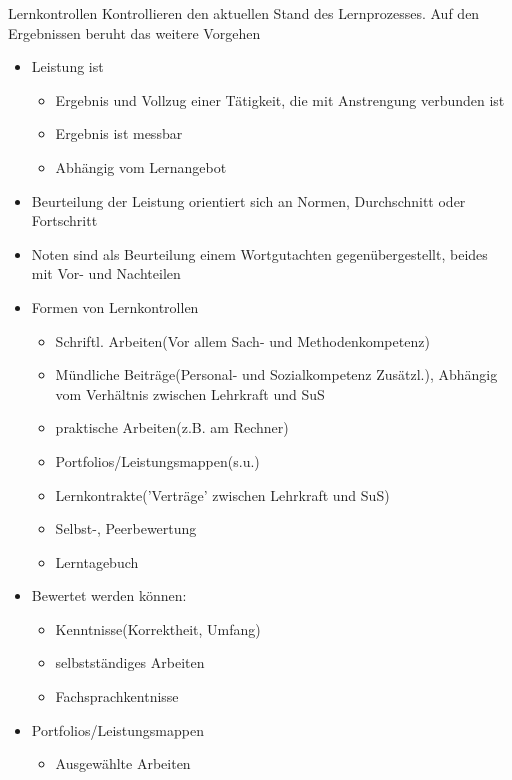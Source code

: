 \documentclass{article}
\begin{document}
\begin{block}{Lernkontrollen}
    Kontrollieren den aktuellen Stand des Lernprozesses. Auf den Ergebnissen  beruht das weitere Vorgehen
    \begin{itemize}
        \item Leistung ist
        \begin{itemize}
            \item Ergebnis und Vollzug einer Tätigkeit, die mit Anstrengung verbunden ist
            \item Ergebnis ist messbar
            \item Abhängig vom Lernangebot
        \end{itemize}
        \item Beurteilung der Leistung orientiert sich an Normen, Durchschnitt oder Fortschritt
        \item Noten sind als Beurteilung einem Wortgutachten gegenübergestellt, beides mit Vor- und Nachteilen
        \item Formen von Lernkontrollen
        \begin{itemize}
            \item Schriftl. Arbeiten(Vor allem Sach- und Methodenkompetenz)
            \item Mündliche Beiträge(Personal- und Sozialkompetenz Zusätzl.), Abhängig vom Verhältnis zwischen Lehrkraft und SuS
            \item praktische Arbeiten(z.B. am Rechner)
            \item Portfolios/Leistungsmappen(s.u.)
            \item Lernkontrakte('Verträge' zwischen Lehrkraft und SuS)
            \item Selbst-, Peerbewertung
            \item Lerntagebuch
        \end{itemize}
        \item Bewertet werden können:
        \begin{itemize}
            \item Kenntnisse(Korrektheit, Umfang)
            \item selbstständiges Arbeiten
            \item Fachsprachkentnisse
        \end{itemize}
        \item Portfolios/Leistungsmappen
        \begin{itemize}
            \item Ausgewählte Arbeiten

\end{itemize}
\end{itemize}
\end{block}
\end{document}
